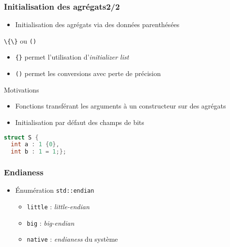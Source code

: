 \documentclass[C++.tex]{subfiles}
\begin{document}
\begin{frame}[fragile]
	\frametitle{Initialisation des agrégats\titlehfill{}2/2}
	\begin{itemize}
		\item Initialisation des agrégats via des données parenthésées
	\end{itemize}

	\begin{block}{\lstinline|\{\}| ou \lstinline|()| }
		\begin{itemize}
			\item \lstinline|{}| permet l'utilisation d'\textit{initializer list}
			\item \lstinline|()| permet les conversions avec perte de précision
		\end{itemize}
	\end{block}

	\begin{block}{Motivations}
		\begin{itemize}
			\item Fonctions transférant les arguments à un constructeur sur des agrégats
		\end{itemize}
	\end{block}


	\begin{itemize}
		\item Initialisation par défaut des champs de bits
	\end{itemize}
		
		\begin{lstlisting}[language=C++]
struct S {
  int a : 1 {0},
  int b : 1 = 1;}; \end{lstlisting}


\end{frame}

\begin{frame}[fragile]
	\frametitle{Endianess}
	\begin{itemize}
		\item Énumération \lstinline|std::endian|
		\begin{itemize}
			\item \lstinline|little| : \textit{little-endian}
			\item \lstinline|big| : \textit{big-endian}
			\item \lstinline|native| : \textit{endianess} du système
		\end{itemize}
	\end{itemize}
\end{frame}
\end{document}
